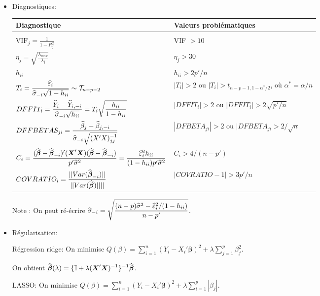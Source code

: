 \documentclass[a4paper, 11pt]{article}
\def\I{\mathbb{I}}
\newcommand{\bm}{\boldmath}
\newcommand{\um}{\unboldmath}
\newcommand{\bobeta}{\mbox{$\boldsymbol\beta$}}
\newcommand{\bo}[1]{\mbox{\bm$#1$\um}}
\newcommand{\boX}{\mbox{$\boldsymbol{X}$}}
\newcommand{\hbobeta}{\widehat{\bobeta}}
\newcommand{\boI}{\bo{\I}}
\begin{document}
\begin{itemize}
\item[$\bullet$] Diagnostiques:

\begin{center}
\begin{tabular}{l|l}
Diagnostique & Valeurs problématiques \\ \hline \\
$\displaystyle\mbox{VIF}_j= \frac{1}{1-R_j^2}$  & VIF $> 10 $ \\[6pt]
$\displaystyle\eta_j=\sqrt{\frac{\lambda_{max}}{\lambda_j}}$ & $\eta_j > 30$ \\[6pt]
$h_{ii}$ & $h_{ii} > 2p'/n$\\[6pt]
$\displaystyle T_i={\widehat\varepsilon_i\over \widehat{\sigma}_{-i}\sqrt{1-h_{ii}}} \sim\mathcal{T}_{n-p-2}$ & $|T_i|>2$ ou $|T_i|>t_{n-p-1, 1-\alpha^*/2}$, o\`u $\alpha^*=\alpha/n$ \\[6pt]
$\displaystyle DFFIT_i={\widehat{Y}_i-\widehat{Y}_{i,-i}\over \widehat{\sigma}_{-i}\sqrt{h_{ii}}}=T_i\sqrt{\frac{h_{ii}}{1-h_{ii}}}$ & $|DFFIT_i|>2$  ou $|DFFIT_i|>2\sqrt{p'/n}$ \\[6pt]
$\displaystyle DFFBETAS_{ji}={\widehat{\beta}_j-\widehat{\beta}_{j,-i}\over \widehat{\sigma}_{-i}\sqrt{(X'X)^{-1}_{jj}}}$ & $|DFBETA_{ji}|>2$  ou $|DFBETA_{ji} > 2 / \sqrt{n}$\\[6pt]
$\displaystyle C_i = {(\widehat{\bobeta}-\widehat{\bobeta}_{-i})'(\boX'\boX)(\widehat{\bobeta}-\widehat{\bobeta}_{-i}) \over p' \widehat\sigma^2}=\frac{\widehat{\varepsilon}_i^2h_{ii}}{(1-h_{ii})p'\widehat{\sigma}^2}$ & $C_i > 4 / (n-p')$ \\
$\displaystyle COVRATIO_i = {||Var(\widehat{\bobeta}_{-i})||\over||Var(\widehat{\bobeta})||||}$ & $\big|COVRATIO-1\big|>3p'/n$ 
\end{tabular}
\end{center}


Note : On peut ré-écrire $\displaystyle\widehat{\sigma}_{-i}=\sqrt{{(n-p)\widehat{\sigma}^2-\widehat\varepsilon_i^2/(1-h_{ii})\over n-p'}}$.


\medskip\medskip\medskip
\item[$\bullet$]  Régularisation:

\medskip
Régression ridge: On minimise $\displaystyle Q(\beta) = \sum_{i=1}^n (Y_i - X_i' \bobeta)^2 + \lambda \sum_{j=1}^p \beta_j^2 $.

\hspace{3cm} On obtient $\displaystyle\hbobeta(\lambda) = \{\boI+\lambda(\boX'\boX)^{-1}\}^{-1}\hbobeta$.


LASSO: On minimise  $\displaystyle Q(\beta) = \sum_{i=1}^n (Y_i - X_i' \bobeta)^2 + \lambda \sum_{i=1}^p | \beta_j | $.


\end{itemize}




\end{document}
